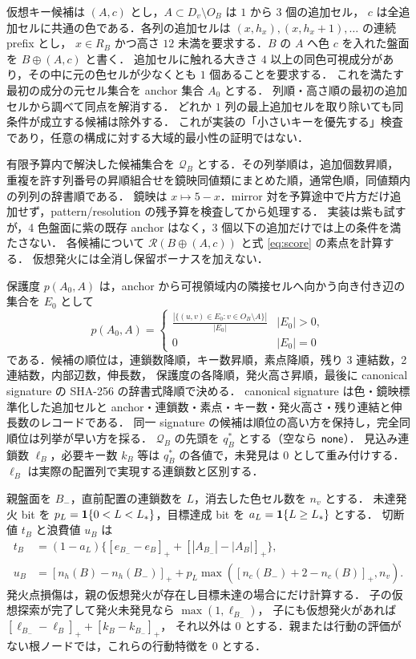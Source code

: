 仮想キー候補は $(A,c)$ とし，$A\subset D_v\setminus O_B$ は $1$ から $3$ 個の追加セル，
$c$ は全追加セルに共通の色である．各列の追加セルは $(x,h_x),(x,h_x+1),\ldots$ の連続 prefix とし，
$x\in R_B$ かつ高さ $12$ 未満を要求する．$B$ の $A$ へ色 $c$ を入れた盤面を $B\oplus(A,c)$ と書く．
追加セルに触れる大きさ $4$ 以上の同色可視成分があり，その中に元の色セルが少なくとも $1$ 個あることを要求する．
これを満たす最初の成分の元セル集合を anchor 集合 $A_0$ とする．
列順・高さ順の最初の追加セルから調べて同点を解消する．
どれか $1$ 列の最上追加セルを取り除いても同条件が成立する候補は除外する．
これが実装の「小さいキーを優先する」検査であり，任意の構成に対する大域的最小性の証明ではない．

有限予算内で解決した候補集合を $\mathcal Q_B$ とする．その列挙順は，追加個数昇順，
重複を許す列番号の昇順組合せを鏡映同値類にまとめた順，通常色順，同値類内の列列の辞書順である．
鏡映は $x\mapsto5-x$．mirror 対を予算途中で片方だけ追加せず，pattern/resolution の残予算を検査してから処理する．
実装は紫も試すが，4 色盤面に紫の既存 anchor はなく，3 個以下の追加だけでは上の条件を満たさない．
各候補について $\mathcal R(B\oplus(A,c))$ と式 \eqref{eq:score} の素点を計算する．
仮想発火には全消し保留ボーナスを加えない．

保護度 $p(A_0,A)$ は，anchor から可視領域内の隣接セルへ向かう向き付き辺の集合を $E_0$ として
\begin{equation}\label{eq:protection}
 p(A_0,A)=\begin{cases}
 \displaystyle\frac{|\{(u,v)\in E_0:v\in O_B\setminus A\}|}{|E_0|}&|E_0|>0,\\
 0&|E_0|=0
 \end{cases}
\end{equation}
である．候補の順位は，連鎖数降順，キー数昇順，素点降順，残り 3 連結数，2 連結数，内部辺数，伸長数，
保護度の各降順，発火高さ昇順，最後に canonical signature の SHA-256 の辞書式降順で決める．
canonical signature は色・鏡映標準化した追加セルと anchor・連鎖数・素点・キー数・発火高さ・残り連結と伸長数のレコードである．
同一 signature の候補は順位の高い方を保持し，完全同順位は列挙が早い方を採る．
$\mathcal Q_B$ の先頭を $q_B^*$ とする（空なら $\mathsf{none}$）．
見込み連鎖数 $\ell_B$，必要キー数 $k_B$ 等は $q_B^*$ の各値で，未発見は $0$ として重み付けする．
$\ell_B$ は実際の配置列で実現する連鎖数と区別する．

親盤面を $B_-$，直前配置の連鎖数を $L$，消去した色セル数を $n_v$ とする．
未達発火 bit を $p_L=\mathbf{1}\{0<L<L_*\}$，目標達成 bit を $a_L=\mathbf{1}\{L\ge L_*\}$ とする．
切断値 $t_B$ と浪費値 $u_B$ は
\begin{equation}\label{eq:action-costs}
\begin{split}
 t_B&=(1-a_L)\{[e_{B_-}-e_B]_+ + [|A_{B_-}|-|A_B|]_+\},\\
 u_B&=[n_h(B)-n_h(B_-)]_+
       +p_L\max([n_c(B_-)+2-n_c(B)]_+,n_v).
\end{split}
\end{equation}
発火点損傷は，親の仮想発火が存在し目標未達の場合にだけ計算する．
子の仮想探索が完了して発火未発見なら $\max(1,\ell_{B_-})$，
子にも仮想発火があれば $[\ell_{B_-}-\ell_B]_+ + [k_B-k_{B_-}]_+$，
それ以外は $0$ とする．親または行動の評価がない根ノードでは，これらの行動特徴を $0$ とする．
